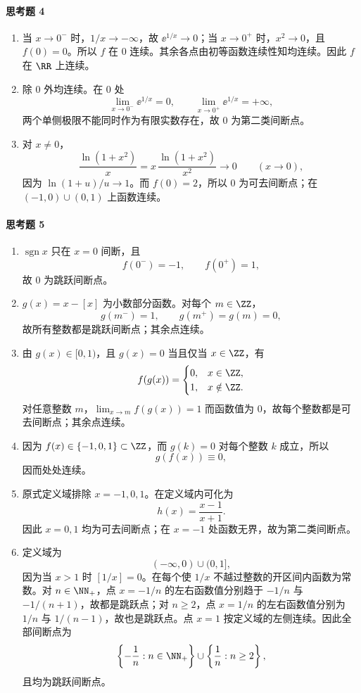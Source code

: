 \paragraph{思考题 4}
\begin{xsolution}
\begin{enumerate}[label=(\arabic*)]
 \item 当 $x\to0^-$ 时，$1/x\to-\infty$，故 $\ee^{1/x}\to0$；当 $x\to0^+$ 时，$x^2\to0$，且 $f(0)=0$。所以 $f$ 在 $0$ 连续。其余各点由初等函数连续性知均连续。因此 $f$ 在 $\RR$ 上连续。
 \item 除 $0$ 外均连续。在 $0$ 处
 \[
  \lim_{x\to0^-}\ee^{1/x}=0,\qquad
  \lim_{x\to0^+}\ee^{1/x}=+\infty,
 \]
 两个单侧极限不能同时作为有限实数存在，故 $0$ 为第二类间断点。
 \item 对 $x\ne0$，
 \[
  \frac{\ln(1+x^2)}x
  =x\,\frac{\ln(1+x^2)}{x^2}\longrightarrow0
  \qquad(x\to0),
 \]
 因为 $\ln(1+u)/u\to1$。而 $f(0)=2$，所以 $0$ 为可去间断点；在 $(-1,0)\cup(0,1)$ 上函数连续。
\end{enumerate}
\end{xsolution}

\paragraph{思考题 5}
\begin{xsolution}
\begin{enumerate}[label=(\arabic*)]
 \item $\operatorname{sgn}x$ 只在 $x=0$ 间断，且
 \[
  f(0^-)=-1,\qquad f(0^+)=1,
 \]
 故 $0$ 为跳跃间断点。

 \item $g(x)=x-[x]$ 为小数部分函数。对每个 $m\in\ZZ$，
 \[
  g(m^-)=1,\qquad g(m^+)=g(m)=0,
 \]
 故所有整数都是跳跃间断点；其余点连续。

 \item 由 $g(x)\in[0,1)$，且 $g(x)=0$ 当且仅当 $x\in\ZZ$，有
 \[
  f(g(x))=\begin{cases}0,&x\in\ZZ,\\1,&x\notin\ZZ.
  \end{cases}
 \]
 对任意整数 $m$，$\lim_{x\to m}f(g(x))=1$ 而函数值为 $0$，故每个整数都是可去间断点；其余点连续。

 \item 因为 $f(x)\in\{-1,0,1\}\subset\ZZ$，而 $g(k)=0$ 对每个整数 $k$ 成立，所以
 \[
  g(f(x))\equiv0,
 \]
 因而处处连续。

 \item 原式定义域排除 $x=-1,0,1$。在定义域内可化为
 \[
  h(x)=\frac{x-1}{x+1}.
 \]
 因此 $x=0,1$ 均为可去间断点；在 $x=-1$ 处函数无界，故为第二类间断点。

 \item 定义域为
 \[
  (-\infty,0)\cup(0,1],
 \]
 因为当 $x>1$ 时 $[1/x]=0$。在每个使 $1/x$ 不越过整数的开区间内函数为常数。对 $n\in\NN_+$，点 $x=-1/n$ 的左右函数值分别趋于 $-1/n$ 与 $-1/(n+1)$，故都是跳跃点；对 $n\ge2$，点 $x=1/n$ 的左右函数值分别为 $1/n$ 与 $1/(n-1)$，故也是跳跃点。点 $x=1$ 按定义域的左侧连续。因此全部间断点为
 \[
  \left\{-\frac1n:n\in\NN_+\right\}
  \cup
  \left\{\frac1n:n\ge2\right\},
 \]
 且均为跳跃间断点。
\end{enumerate}
\end{xsolution}

